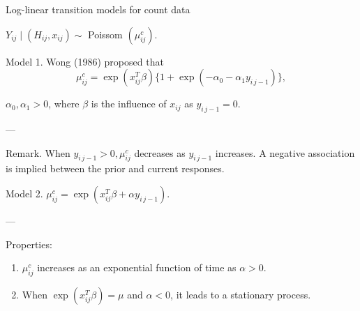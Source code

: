 \documentclass[UTF8,a4paper,10pt]{article}
\begin{document}
\begin{Problem}[]{Log-linear transition models for count data}


 
$Y_{ij} \mid\left(H_{ij}, x_{ij}\right) \sim$ Poissom $\left(\mu^c_{ij}\right)$.

\dotfill

Model 1. Wong (1986) proposed that $$\mu_{ij}^c=\exp \left(x_{ij}^T\beta\right) \{1+\exp \left(-\alpha_0-\alpha_1 y_{i\,j-1}\right)\},$$ 

$\alpha_0, \alpha_1>0$, where $\beta$ is the influence of $x_{ij}$ as $y_{i\,j-1}=0$.

---

Remark. When $y_{i\,j-1}>0, \mu_{ij}^c$ decreases as $y_{i\,j-1}$ increases. A negative association is implied between the prior and current responses.

\dotfill

Model 2. $\mu_{ij}^c=\exp \left(x_{ij}^T\beta+\alpha y_{i\,j-1}\right)$.

---

Properties: 
\begin{enumerate}
  \item $\mu_{ij}^c$ increases as an exponential function of time as $\alpha>0$.
  \item When $\exp \left(x_{ij}^T \beta\right)=\mu$ and $\alpha<0$, it leads to a stationary process.
\end{enumerate}

\end{Problem}


\pagebreak
\end{document}
